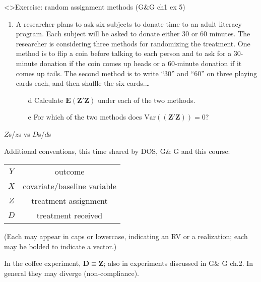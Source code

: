 \begin{frame}<\nottheirhandout>{Exercise: random assignment methods}
{\footnotesize (G\&G ch1 ex 5)}

\begin{enumerate}\addtocounter{enumi}{-1}
\item 
A researcher plans to ask six subjects to donate time to an adult
literacy program. Each subject will be asked to donate either 30 or 60
minutes. The researcher is considering three methods for randomizing
the treatment. One method is to flip a coin before talking to each
person and to ask for a 30-minute donation if the coin comes up heads
or a 60-minute donation if it comes up tails. The second method is to
write ``30'' and ``60'' on three playing cards each, and then shuffle
the six cards.\ldots

\begin{itemize}
\item[d] Calculate $\mathbf{E}(\mathbf{Z}'\mathbf{Z})$ under each of the two methods.
\item[e] For which of the two methods does $\mathrm{Var}((\mathbf{Z}'\mathbf{Z})) = 0$?
\end{itemize}
\end{enumerate}

\end{frame}


\begin{frame}{$Z$s/$z$s vs $D$s/$d$s}
  
Additional conventions, this time shared by DOS, G\& G and this course:

\begin{tabular}{cc}
  $Y$ & outcome \\
  $X$ & covariate/baseline variable\\
  $Z$ & treatment assignment\\
  $D$ & treatment received \\
\end{tabular}
\pause

(Each may appear in caps or lowercase, indicating an RV or a realization; each may be bolded to indicate a vector.) \pause

In the coffee experiment, $\mathbf{D} \equiv \mathbf{Z}$; also in experiments discussed in G\& G ch.2.  In general they may diverge (non-compliance). 

\end{frame}

